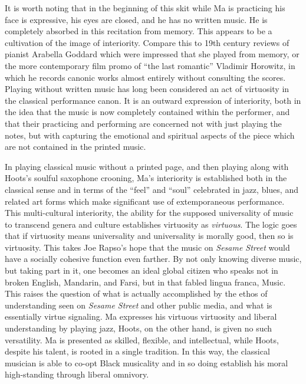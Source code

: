 \documentclass[12pt,letterpaper]{article}
\newcommand{\ses}{\textit{Sesame Street }}
\begin{document}
	It is worth noting that in the beginning of this skit while Ma is 
	practicing his face is expressive, his eyes are closed, and he has no 
	written music. He is completely absorbed in this recitation from memory.
	This appears to be a cultivation of the image of interiority. Compare
	this to 19th century reviews of pianist Arabella Goddard which were 
	impressed that she played from memory,\autocite{Goddard} or the more 
	contemporary film promo of ``the last romantic'' Vladimir Horowitz, in 
	which he records canonic works almost entirely without consulting the 
	scores. Playing without written music has long been considered an act of
	virtuosity in the classical performance canon. It is an outward 
	expression of interiority, both in the idea that the music is now 
	completely contained within the performer, and that their practicing and
	performing are concerned not with just playing the notes, but 
	with capturing the emotional and spiritual aspects of the piece which 
	are not contained in the printed music. 

	In playing classical music without a printed page, and then playing 
	along with Hoots's soulful saxophone crooning, Ma's interiority is 
	established both in the classical sense and in terms of the ``feel'' and
	``soul'' celebrated in jazz, blues, and related art forms which make 
	significant use of extemporaneous performance. This multi-cultural 
	interiority, the ability for the supposed universality of music to 
	transcend 
	genera and culture establishes virtuosity as \textit{virtuous}.
	The logic goes that if virtuosity means universality and universality is
	morally good, then so is virtuosity. This takes Joe Rapso's hope that 
	the music on \textit{Sesame Street} would have a socially cohesive 
	function even farther. By not only knowing diverse music, but taking 
	part in it, one becomes an ideal global citizen who speaks not in broken
	English, Mandarin, and Farsi, but in that fabled lingua franca, Music.   
	This raises the question of what is actually accomplished by the ethos
	of understanding seen on \ses and other public media, and what is
	essentially virtue signaling. Ma expresses his virtuous virtuosity and 
	liberal understanding by playing jazz, Hoots, on the other hand, is 
	given no such versatility. Ma is presented as skilled, flexible, and 
	intellectual, while Hoots, despite his talent, is rooted in a single 
	tradition. In this way, the classical musician is able to co-opt Black 
	musicality and in so doing establish his moral high-standing through 
	liberal omnivory. 
\end{document}
